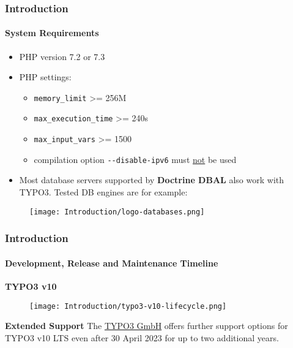 
\begin{frame}[fragile]
	\frametitle{Introduction}
	\framesubtitle{System Requirements}

	\begin{itemize}
		\item PHP version 7.2 or 7.3
		\item PHP settings:

			\begin{itemize}
				\item \texttt{memory\_limit} >= 256M
				\item \texttt{max\_execution\_time} >= 240s
				\item \texttt{max\_input\_vars} >= 1500
				\item compilation option \texttt{-}\texttt{-disable-ipv6} must \underline{not} be used
			\end{itemize}

		\item Most database servers supported by \textbf{Doctrine DBAL} also work with TYPO3.
			Tested DB engines are for example:
	\end{itemize}

	\begin{figure}
		\texttt{[image: Introduction/logo-databases.png]}
	\end{figure}

\end{frame}


\begin{frame}[fragile]
	\frametitle{Introduction}
	\framesubtitle{Development, Release and Maintenance Timeline}

	\textbf{TYPO3 v10}

	\begin{figure}
		\texttt{[image: Introduction/typo3-v10-lifecycle.png]}
	\end{figure}

	\textbf{Extended Support}\newline
	\smaller
		The \href{https://typo3.com}{TYPO3 GmbH} offers further support options
		for TYPO3 v10 LTS even after 30 April 2023 for up to two additional
		years.
	\normalsize

\end{frame}

